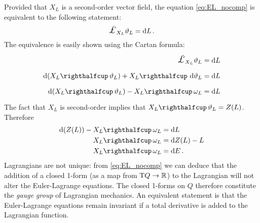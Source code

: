 Provided that $X_L$ is a second-order vector field, the equation \cref{eq:EL_nocomp} is equivalent to the following statement:
\begin{equation}
    \lied{X_L}{\theta_L} = \dd{L}.
\end{equation}
The equivalence is easily shown using the Cartan formula:
\begin{equation*}
    \begin{split}
        \lied{X_L}{\theta_L} &= \dd{L} \\
        \dd{\qty(\intpr{X_L}{\theta_L})} + \intpr{X_L}{\dd{\theta_L}} &= \dd{L} \\
        \dd{\qty(\intpr{X_L}{\theta_L})} - \intpr{X_L}{\omega_L} &= \dd{L}
    \end{split}
\end{equation*}
The fact that $X_L$ is second-order implies that $\intpr{X_L}{\theta_L} = Z(L)$. Therefore 
\begin{equation*}
    \begin{split}
        \dd{(Z(L))} - \intpr{X_L}{\omega_L} &= \dd{L} \\
        \intpr{X_L}{\omega_L} &= \dd{Z(L) - L} \\
        \intpr{X_L}{\omega_L} &= \dd{E}.
    \end{split}
\end{equation*}
Lagrangians are not unique: from \cref{eq:EL_nocomp} we can deduce that the addition of a closed 1-form (as a map from $\mathrm{T}Q \to \mathbb{R}$) to the Lagrangian will not alter the Euler-Lagrange equations. The closed 1-forms on $Q$  therefore constitute the \emph{gauge group} of Lagrangian mechanics. An equivalent statement is that the Euler-Lagrange equations remain invariant if a total derivative is added to the Lagrangian function. \cite{Abraham1978}
